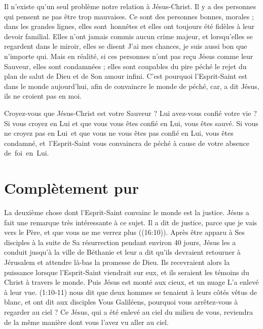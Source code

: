 Il n'existe qu'un seul problème\frcolon{} notre relation à Jésus-Christ.
 Il y a des personnes qui pensent ne pas être trop mauvaises.
 Ce sont des personnes bonnes, morales ; dans les grandes lignes,
 elles sont~honnêtes et elles ont toujours été fidèles
 à leur devoir familial. Elles n'ont jamais commis aucun crime majeur,
 et lorsqu'elles se regardent dans le miroir, elles se disent\frcolon{}
 \Og  J'ai mes chances, je suis aussi bon que n'importe qui. \Fg{}
 Mais en réalité, si ces personnes n'ont pas reçu Jésus comme leur Sauveur,
 elles sont condamnées ; elles sont coupables du pire péché
 \ocadr le rejet du plan de salut de Dieu et de Son amour infini.
 C'est pourquoi l'Esprit-Saint est dans le monde aujourd'hui,
 afin de convaincre le monde de péché,
 \Og car, a dit Jésus, ils ne croient pas en moi. \Fg{}

Croyez-vous que Jésus-Christ est votre Sauveur ?
 Lui avez-vous confié votre vie ? Si vous croyez en Lui et que vous vous êtes
 confié en Lui, vous êtes sauvé.
 Si vous ne croyez pas en Lui~et que vous ne vous êtes pas confié en Lui,
 vous êtes condamné, et~l'Esprit-Saint vous convaincra de péché
 à cause de votre absence de~foi~en~Lui. %


\section{Compl\`etement pur}

La deuxième chose dont l'Esprit-Saint convainc le monde est la justice.
 Jésus a fait une remarque très intéressante à ce sujet. Il a dit\frcolon{}
 \Og [\dots{}] de justice, parce que je vais vers le Père,
 et que vous ne me verrez plus \Fg{} ((16:10)).
 Après être apparu à Ses disciples à la suite de Sa résurrection
 pendant environ 40 jours, Jésus les a conduit jusqu'à la ville
 de Béthanie et leur a dit qu'ils devraient retourner à Jérusalem
 et attendre là-bas la promesse de Dieu.
 Ils recevraient alors la puissance lorsque l'Esprit-Saint viendrait sur eux,
 et ils seraient les témoins du Christ à travers le monde.
 Puis Jésus est monté aux cieux, et un nuage L'a enlevé à leur vue.
 (1:10-11) nous dit que deux hommes se tenaient à leurs côtés
 vêtus de blanc, et ont dit aux disciples\frcolon{}
 \Og Vous Galiléens, pourquoi vous arrêtez-vous à regarder au ciel ?
 Ce Jésus, qui a été enlevé au ciel du milieu de vous,
 reviendra de la même manière dont vous l'avez vu aller au ciel. \Fg{}

